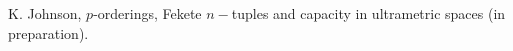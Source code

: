 \documentclass{beamer}
\theoremstyle{definition}
\begin{document}
\begin{frame}
\begin{thebibliography}{9}
	 K. Johnson, $p$-orderings, Fekete $n-$tuples and capacity in ultrametric spaces (in preparation).
\end{thebibliography}\end{frame}
\end{document}
